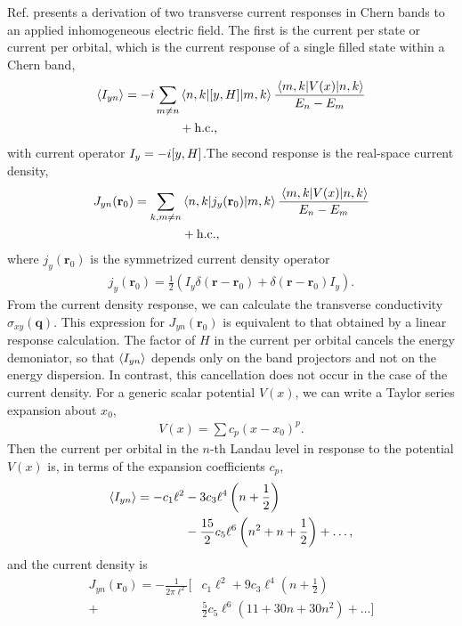 \documentclass[aps,prb,twocolumn,letterpaper,twoside,nobalancelastpage,groupedaddress,amsmath,amssymb,floatfix,citeautoscript]{revtex4-1}
\begin{document}
Ref.  presents a derivation of two transverse current responses in Chern bands to an applied inhomogeneous electric field. The first is the current per state or current per orbital, which is the current response of a single filled state within a Chern band,
\begin{align}
\label{current-per-orbital}
\expval{I_{yn}} = -i\sum_{m\neq n} &\mel{n,k}{\comm{y}{H}}{m,k}\frac{\mel{m,k}{V(x)}{n,k}}{E_n-E_m}\nonumber\\ &+ \text{h.c.,}
\end{align}
with current operator $I_{y} = -i\comm{y}{H}$.The second response is the real-space current density, 
\begin{align}
\label{current-density}
J_{yn}(\mathbf{r}_0) = \sum_{k,m\neq n} &\mel{n,k}{j_y(\mathbf{r}_0)}{m,k} \frac{\mel{m,k}{V(x)}{n,k}}{E_n-E_m}\nonumber \\ &+ \text{h.c.,}
\end{align}
where $j_y(\mathbf{r}_0)$ is the symmetrized current density operator
\begin{align*}
j_y(\mathbf{r}_0) = \frac{1}{2}\left(I_y \delta(\mathbf{r} - \mathbf{r}_0) + \delta(\mathbf{r} - \mathbf{r}_0)I_y \right).
\end{align*}
From the current density response, we can calculate the transverse conductivity $\sigma_{xy}(\mathbf{q})$. This expression for $J_{yn}(\mathbf{r}_0)$ is equivalent to that obtained by a linear response calculation\cite{harper_finite-wavevector_2018}. The factor of $H$ in the current per orbital cancels the energy demoniator, so that $\expval{I_{yn}}$ depends only on the band projectors and not on the energy dispersion. In contrast, this cancellation does not occur in the case of the current density. For a generic scalar potential $V(x)$, we can write a Taylor series expansion about $x_0$,
\begin{align*}
V(x) = \sum c_p (x - x_0)^p.
\end{align*}
Then the current per orbital in the $n$-th Landau level in response to the potential $V(x)$ is, in terms of the expansion coefficients $c_p$,
\begin{align}
\label{current-per-orbital-expansion}
\expval{I_{yn}} = -c_1\ell^2 &- 3c_3 \ell^4\left(n+\frac{1}{2}\right)\nonumber\\ &- \frac{15}{2}c_5\ell^6 \left(n^2 + n + \frac{1}{2}\right) + \ldots,
\end{align}
and the current density is
\begin{align}
\label{current-density-expansion}
J_{yn}(\mathbf{r}_0)=-\frac{1}{2\pi\ell^2}[&c_1\ell^2 + 9c_3 \ell^4\left(n+\frac{1}{2}\right) \nonumber\\ + &\frac{5}{2}c_5 \ell^6\left(11 + 30n + 30n^2\right) + \ldots]
\end{align}
\end{document}
